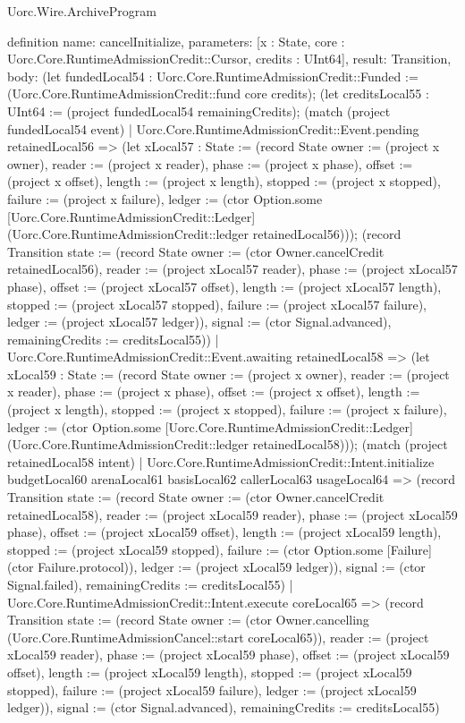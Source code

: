 \begin{lexlean}{Uorc.Wire.ArchiveProgram}
\begin{semanticmodule}
definition{
  name: cancelInitialize,
  parameters: [x : State, core : Uorc.Core.RuntimeAdmissionCredit::Cursor, credits : UInt64],
  result: Transition,
  body: (let fundedLocal54 : Uorc.Core.RuntimeAdmissionCredit::Funded := (Uorc.Core.RuntimeAdmissionCredit::fund core credits); (let creditsLocal55 : UInt64 := (project fundedLocal54 remainingCredits); (match (project fundedLocal54 event)
    | Uorc.Core.RuntimeAdmissionCredit::Event.pending retainedLocal56 => (let xLocal57 : State := (record State {owner := (project x owner), reader := (project x reader), phase := (project x phase), offset := (project x offset), length := (project x length), stopped := (project x stopped), failure := (project x failure), ledger := (ctor Option.some [Uorc.Core.RuntimeAdmissionCredit::Ledger] (Uorc.Core.RuntimeAdmissionCredit::ledger retainedLocal56))}); (record Transition {state := (record State {owner := (ctor Owner.cancelCredit retainedLocal56), reader := (project xLocal57 reader), phase := (project xLocal57 phase), offset := (project xLocal57 offset), length := (project xLocal57 length), stopped := (project xLocal57 stopped), failure := (project xLocal57 failure), ledger := (project xLocal57 ledger)}), signal := (ctor Signal.advanced), remainingCredits := creditsLocal55}))
    | Uorc.Core.RuntimeAdmissionCredit::Event.awaiting retainedLocal58 => (let xLocal59 : State := (record State {owner := (project x owner), reader := (project x reader), phase := (project x phase), offset := (project x offset), length := (project x length), stopped := (project x stopped), failure := (project x failure), ledger := (ctor Option.some [Uorc.Core.RuntimeAdmissionCredit::Ledger] (Uorc.Core.RuntimeAdmissionCredit::ledger retainedLocal58))}); (match (project retainedLocal58 intent)
      | Uorc.Core.RuntimeAdmissionCredit::Intent.initialize budgetLocal60 arenaLocal61 basisLocal62 callerLocal63 usageLocal64 => (record Transition {state := (record State {owner := (ctor Owner.cancelCredit retainedLocal58), reader := (project xLocal59 reader), phase := (project xLocal59 phase), offset := (project xLocal59 offset), length := (project xLocal59 length), stopped := (project xLocal59 stopped), failure := (ctor Option.some [Failure] (ctor Failure.protocol)), ledger := (project xLocal59 ledger)}), signal := (ctor Signal.failed), remainingCredits := creditsLocal55})
      | Uorc.Core.RuntimeAdmissionCredit::Intent.execute coreLocal65 => (record Transition {state := (record State {owner := (ctor Owner.cancelling (Uorc.Core.RuntimeAdmissionCancel::start coreLocal65)), reader := (project xLocal59 reader), phase := (project xLocal59 phase), offset := (project xLocal59 offset), length := (project xLocal59 length), stopped := (project xLocal59 stopped), failure := (project xLocal59 failure), ledger := (project xLocal59 ledger)}), signal := (ctor Signal.advanced), remainingCredits := creditsLocal55})
}
\end{semanticmodule}
\end{lexlean}
